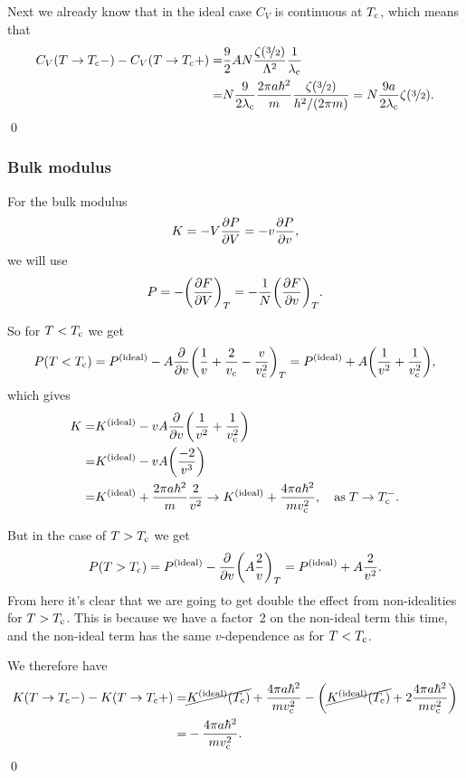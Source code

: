 \documentclass[11pt,letter, swedish, english
]{article}
\begin{document}
Next we already know that in the ideal case $C_V$ is continuous at
$T_{\text{c}}$, which means that
\begin{equation}
\begin{aligned}
C_V(T\to T_{\text{c}}-)-C_V(T\to T_{\text{c}}+)
=&\frac{9}{2}AN\frac{\zeta(\nicefrac{3}{2})}{\Lambda^2}\frac{1}{\lambda_{\text{c}}}\\
=&N\frac{9}{2\lambda_{\text{c}}}\frac{2\pi a \hbar^2}{m}
\frac{\zeta(\nicefrac{3}{2})}{h^2/(2\pi m)}
=N\frac{9a}{2\lambda_{\text{c}}}\zeta(\nicefrac{3}{2}).
\end{aligned}
\end{equation}
\qed

\subsubsection{Bulk modulus}
For the bulk modulus
\begin{equation}
K=-V\pdv{P}{V}=-v\pdv{P}{v},
\end{equation}
we will use
\begin{equation}
P=-\qty(\pdv{F}{V})_T
=-\frac{1}{N}\qty(\pdv{F}{v})_T.
\end{equation}

So for $T<T_{\text{c}}$ we get
\begin{equation}\label{eq:3_P<Tc}
P(T<T_{\text{c}})=P^\text{{(ideal)}}-A\pdv{v}\qty(\frac{1}{v}+\frac{2}{v_{\text{c}}}-\frac{v}{v_{\text{c}}^2})_T
=P^\text{{(ideal)}}+A\qty(\frac{1}{v^2}+\frac{1}{v_{\text{c}}^2}),
\end{equation}
which gives
\begin{equation}
\begin{aligned}
K=&\ideal{K}-vA\pdv{v}\qty(\frac{1}{v^2}+\frac{1}{\vc^2})\\
=&\ideal{K}-vA\qty(\frac{-2}{v^3})\\
=&\ideal{K}+\frac{2\pi a\hbar^2}{m}\frac{2}{v^2}
\to \ideal{K}+\frac{4\pi a\hbar^2}{m\vc^2}
\qcomma\text{as}\; T\to\Tc^-.
\end{aligned}
\end{equation}

But in the case of $T>T_{\text{c}}$ we get
\begin{equation}\label{eq:3_P>Tc}
P(T>T_{\text{c}})=P^\text{{(ideal)}}-\pdv{v}\qty(A\frac{2}{v})_T
=P^\text{{(ideal)}}+A\frac{2}{v^2}.
\end{equation}
From here it's clear that we are going to get double the effect from
non-idealities for $T>T_{\text{c}}$. This is because we have a factor~2 on the non-ideal
term this time, and the non-ideal term has the same $v$-dependence as
for $T<T_{\text{c}}$.

We therefore have
\begin{equation}
\begin{aligned}
K(T\to T_{\text{c}}-)-K(T\to T_{\text{c}}+)
=&\cancel{K^\text{{(ideal)}}(T_{\text{c}})}+\frac{4\pi a\hbar^2}{mv_{\text{c}}^2}
-\qty(\cancel{K^\text{{(ideal)}}(T_{\text{c}})}+2\frac{4\pi a\hbar^2}{mv_{\text{c}}^2})\\
=&-\frac{4\pi a\hbar^2}{mv_{\text{c}}^2}.
\end{aligned}
\end{equation}
\qed
\end{document}
